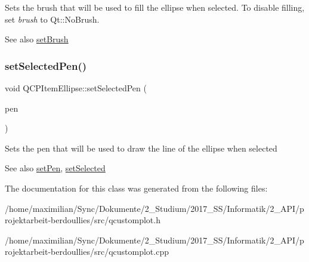 Sets the brush that will be used to fill the ellipse when selected. To disable filling, set {\itshape brush} to Qt\+::\+No\+Brush.

\begin{DoxySeeAlso}{See also}
\hyperlink{class_q_c_p_item_ellipse_a49fc74e6965834e873d027d026def798}{set\+Brush} 
\end{DoxySeeAlso}
\mbox{\label{class_q_c_p_item_ellipse_a6c542fba1dc918041c583f58a50dde99}} 
\subsubsection{\texorpdfstring{set\+Selected\+Pen()}{setSelectedPen()}}
{\footnotesize\ttfamily void Q\+C\+P\+Item\+Ellipse\+::set\+Selected\+Pen (\begin{DoxyParamCaption}\item[{const Q\+Pen \&}]{pen }\end{DoxyParamCaption})}

Sets the pen that will be used to draw the line of the ellipse when selected

\begin{DoxySeeAlso}{See also}
\hyperlink{class_q_c_p_item_ellipse_adb81a663ed2420fcfa011e49f678d1a6}{set\+Pen}, \hyperlink{class_q_c_p_abstract_item_a203de94ad586cc44d16c9565f49d3378}{set\+Selected} 
\end{DoxySeeAlso}


The documentation for this class was generated from the following files\+:\begin{DoxyCompactItemize}
\item 
/home/maximilian/\+Sync/\+Dokumente/2\+\_\+\+Studium/2017\+\_\+\+S\+S/\+Informatik/2\+\_\+\+A\+P\+I/projektarbeit-\/berdoullies/src/qcustomplot.\+h\item 
/home/maximilian/\+Sync/\+Dokumente/2\+\_\+\+Studium/2017\+\_\+\+S\+S/\+Informatik/2\+\_\+\+A\+P\+I/projektarbeit-\/berdoullies/src/qcustomplot.\+cpp\end{DoxyCompactItemize}
